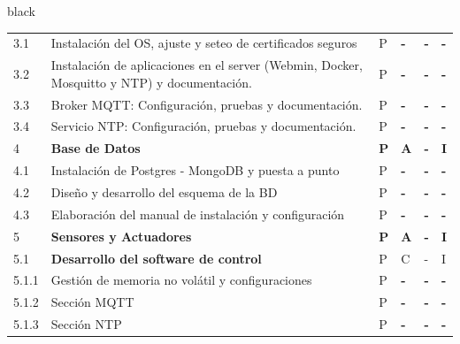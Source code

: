 \documentclass[11pt]{charter}
\begin{document}
\begin{landscape}
\begin{consigna}{black}
\begin{tabularx}{\linewidth}{@{}|p{1.3cm}|p{9.3cm}|p{3cm}|p{3cm}|p{3cm}|p{3cm}|@{}}
3.1                    & Instalación del OS, ajuste y   seteo de certificados seguros                                  & P          & \textbf{-} & \textbf{-} & \textbf{-} \\
3.2                    & Instalación de aplicaciones en   el server (Webmin, Docker, Mosquitto y NTP) y documentación. & P          & \textbf{-} & \textbf{-} & \textbf{-} \\
3.3                    & Broker MQTT: Configuración,   pruebas y documentación.                                        & P          & \textbf{-} & \textbf{-} & \textbf{-} \\
3.4                    & Servicio NTP: Configuración,   pruebas y documentación.                                       & P          & \textbf{-} & \textbf{-} & \textbf{-} \\
4                      & \textbf{Base de Datos}                                                                        & \textbf{P} & \textbf{A} & \textbf{-} & \textbf{I} \\
4.1                    & Instalación de Postgres -   MongoDB y puesta a punto                                          & P          & \textbf{-} & \textbf{-} & \textbf{-} \\
4.2                    & Diseño y desarrollo del esquema   de la BD                                                    & P          & \textbf{-} & \textbf{-} & \textbf{-} \\
4.3                    & Elaboración del manual de   instalación y configuración                                       & P          & \textbf{-} & \textbf{-} & \textbf{-} \\
5                      & \textbf{Sensores y Actuadores}                                                                & \textbf{P} & \textbf{A} & \textbf{-} & \textbf{I} \\
5.1                    & \textbf{Desarrollo del software de   control}                                                 & P          & C          & -          & I          \\
5.1.1                  & Gestión de memoria no volátil y   configuraciones                                             & P          & \textbf{-} & \textbf{-} & \textbf{-} \\
5.1.2                  & Sección MQTT                                                                                  & P          & \textbf{-} & \textbf{-} & \textbf{-} \\
5.1.3                  & Sección NTP                                                                                   & P          & \textbf{-} & \textbf{-} & \textbf{-} \\

\end{tabularx}
\end{consigna}
\end{landscape}
\end{document}
